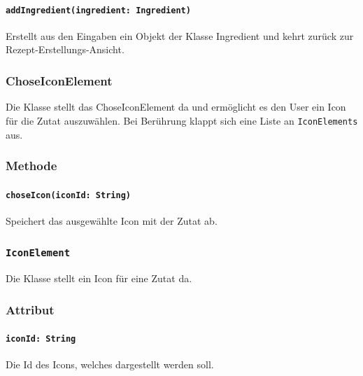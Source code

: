 \documentclass[parskip=full]{scrartcl}
\begin{document}
                \paragraph*{\texttt{addIngredient(ingredient: Ingredient)}}  Erstellt aus den Eingaben ein Objekt der Klasse Ingredient und kehrt zurück zur Rezept-Erstellungs-Ansicht.

        \subsubsection*{ChoseIconElement}
        Die Klasse stellt das ChoseIconElement da und ermöglicht es den User ein Icon für die Zutat auszuwählen. Bei Berührung klappt sich eine Liste an \texttt{IconElements} aus.
            \subsubsection*{Methode}
                \paragraph*{\texttt{choseIcon(iconId: String)}} Speichert das ausgewählte Icon mit der Zutat ab.

        \subsubsection*{\texttt{IconElement}}
        Die Klasse stellt ein Icon für eine Zutat da.
            \subsubsection*{Attribut}
                \paragraph*{\texttt{iconId: String}} Die Id des Icons, welches dargestellt werden soll.
\end{document}
